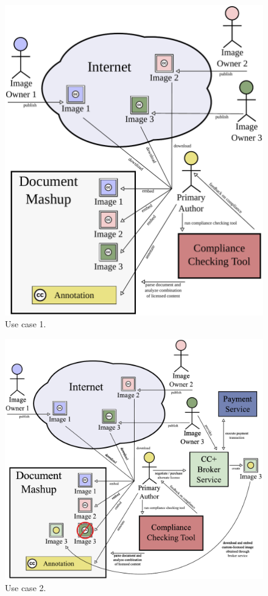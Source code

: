 \documentclass[botnum,fleqn,final]{unmeethesis}
\begin{document}
\begin{figure}[!htpb]
    \begin{center}
        \includegraphics[width=1.0\textwidth]{usecase1-27.pdf}
    \end{center}
  \caption[Use case 1]{Use case 1.}
  \label{fi:usecase1}
\end{figure}

\begin{figure}[!htpb]
    \begin{center}
        \includegraphics[width=1.0\textwidth]{usecase2-full2.pdf}
    \end{center}
  \caption[Use case 2]{Use case 2.}
  \label{fi:usecase2}
\end{figure}
\end{document}
